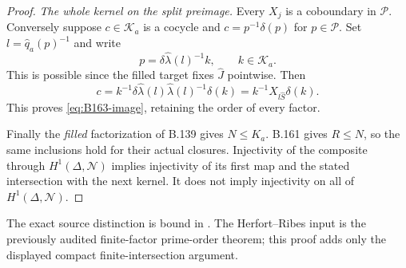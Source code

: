 \begin{proof}
\emph{The whole kernel on the split preimage.}
Every $X_j$ is a coboundary in $\mathcal P$. Conversely suppose
$c\in\mathcal K_a$ is a cocycle and $c=p^{-1}\delta(p)$ for
$p\in\mathcal P$. Set $l=\widehat q_a(p)^{-1}$ and write
\[
 p=\delta\widehat\lambda(l)^{-1}k,\qquad k\in\mathcal K_a.
\]
This is possible since the filled target fixes $\widehat J$ pointwise.
Then
\[
 c=k^{-1}\delta\widehat\lambda(l)\widehat\lambda(l)^{-1}
                   \delta(k)=k^{-1}X_{l\widehat S}\delta(k).
\]
This proves \eqref{eq:B163-image}, retaining the order of every factor.

Finally the \emph{filled} factorization of B.139 gives $N\le K_a$.
B.161 gives $R\le N$, so the same inclusions hold for their actual
closures. Injectivity of the composite through $H^1(\Delta,\mathcal N)$
implies injectivity of its first map and the stated intersection with
the next kernel. It does not imply injectivity on all of
$H^1(\Delta,\mathcal N)$.
\end{proof}
The exact source distinction is bound in
.
The Herfort--Ribes input is the previously audited finite-factor
prime-order theorem; this proof adds only the displayed compact
finite-intersection argument.
